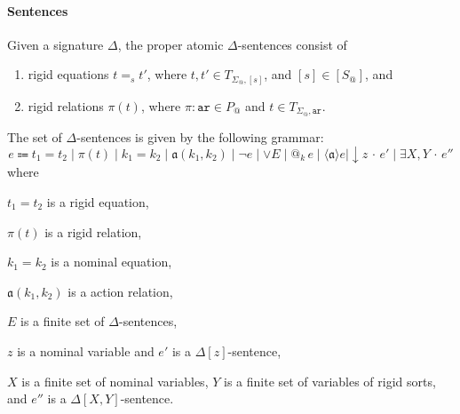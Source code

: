 \documentclass{article}
\makeatletter
\newcommand{\ari}{\mathtt{ar}}
\newcommand{\act}{\mathfrak{a}}
\newcommand{\at}[1]{@_{#1}\,}
\newcommand{\pos}[1]{\langle #1 \rangle}
\newcommand{\store}[1]{{\downarrow}#1\,{\cdot}\,}
\newcommand{\Exists}[1]{\exists #1\,{\cdot}\,}
\makeatother
\begin{document}
\paragraph{Sentences} 
Given a signature $\Delta$, the proper atomic $\Delta$-sentences consist of
 
\begin{enumerate}
\item rigid equations $t=_s t'$, where $t,t'\in T_{\Sigma_@,[s]}$, and $[s]\in [S_@]$, and

\item rigid relations $\pi(t)$, where $\pi\colon\ari \in P_@$ and $t\in T_{\Sigma_@,\ari}$.

\end{enumerate}
 The set of $\Delta$-sentences is given by the following grammar:
$$e\Coloneqq t_1=t_2 \mid \pi(t) \mid k_1=k_2 \mid\act(k_1,k_2)\mid \neg e\mid \vee E\mid \at{k} e\mid \pos{\act}e \mid \store{z}e'\mid \Exists{X,Y}e''$$
where 
\begin{enumerate*}[label=(\alph*)]
 \item $t_1=t_2$ is a rigid equation,
 \item $\pi(t)$ is a rigid relation,
 \item $k_1=k_2$ is a nominal equation,
 \item $\act(k_1,k_2)$ is a action relation,
 \item $E$ is a finite set of $\Delta$-sentences,
 \item $z$ is a nominal variable and $e'$ is a $\Delta[z]$-sentence,
 \item $X$ is a finite set of nominal variables,
       $Y$ is a finite set of variables of rigid sorts, and
       $e''$ is a $\Delta[X,Y]$-sentence.
\end{enumerate*}


\end{document}
